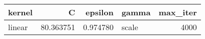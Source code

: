 \begin{tabular}{lrrlr}
\toprule
kernel & C & epsilon & gamma & max_iter \\
\midrule
linear & 80.363751 & 0.974780 & scale & 4000 \\
\bottomrule
\end{tabular}
